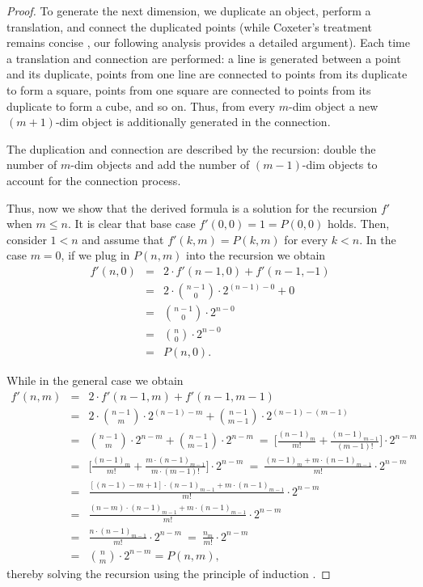 \documentclass{article}
\begin{document}
	\begin{proof}
		To generate the next dimension, we duplicate an object, perform a translation, and connect the duplicated points (while Coxeter’s treatment remains concise \cite{coxeter1973regular}, our following analysis provides a detailed argument). Each time a translation and connection are performed: a line is generated between a point and its duplicate, points from one line are connected to points from its duplicate to form a square, points from one square are connected to points from its duplicate to form a cube, and so on. Thus, from every $m$-dim object a new $(m+1)$-dim object is additionally generated in the connection.
		
		The duplication and connection are described by the recursion: double the number of $m$-dim objects and add the number of $(m-1)$-dim objects to account for the connection process. 
		
		Thus, now we show that the derived formula is a solution for the recursion $f'$ when $m \leq n$. It is clear that base case $f'(0,0) = 1 = P(0,0)$ holds. Then, consider $1<n$ and assume that $f'(k,m) = P(k,m)$ for every $k < n$. In the case $m=0$, if we plug in $P(n,m)$ into the recursion we obtain
		\begin{eqnarray*}
			f'(n,0) & = & 2 \cdot f'(n-1, 0) + f'(n-1, -1)\\
			& = & 2 \cdot \binom{n-1}{0} \cdot 2^{(n-1)-0} + 0\\
			& = & \binom{n-1}{0} \cdot 2^{n-0}\\
			& = & \binom{n}{0} \cdot 2^{n-0}\\
			& = & P(n,0).
		\end{eqnarray*}

		While in the general case we obtain
		\begin{eqnarray*}
			f'(n,m) & = & 2 \cdot f'(n-1, m) + f'(n-1, m-1)\\
			& = & 2 \cdot \binom{n-1}{m} \cdot 2^{(n-1)-m} + \binom{n-1}{m-1} \cdot 2^{(n-1)-(m-1)}\\
			& = & \binom{n-1}{m} \cdot 2^{n-m} + \binom{n-1}{m-1} \cdot 2^{n-m} \ = \ \Big[\frac{(n-1)_{m}}{m!} + \frac{(n-1)_{m-1}}{(m-1)!} \Big] \cdot 2^{n-m}\\
			& = & \Bigg[\frac{(n-1)_{m}}{m!} + \frac{m \cdot (n-1)_{m-1}}{m \cdot (m-1)!} \Bigg] \cdot 2^{n-m} \ = \ \frac{(n-1)_{m} + m \cdot (n-1)_{m-1}}{m!} \cdot 2^{n-m}\\
			& = & \frac{[(n-1) - m + 1] \cdot (n-1)_{m-1} + m \cdot (n-1)_{m-1}}{m!} \cdot 2^{n-m}\\
			& = & \frac{(n- m) \cdot (n-1)_{m-1} + m \cdot (n-1)_{m-1}}{m!} \cdot 2^{n-m}\\
			& = & \frac{n \cdot (n-1)_{m-1}}{m!} \cdot 2^{n-m} \ = \ \frac{n_{m}}{m!} \cdot 2^{n-m}\\
			& = & \binom{n}{m}\cdot2^{n-m} = P(n,m),
		\end{eqnarray*}
		thereby solving the recursion using the principle of induction \cite{rosen2011discrete}.
	\end{proof}
\end{document}
